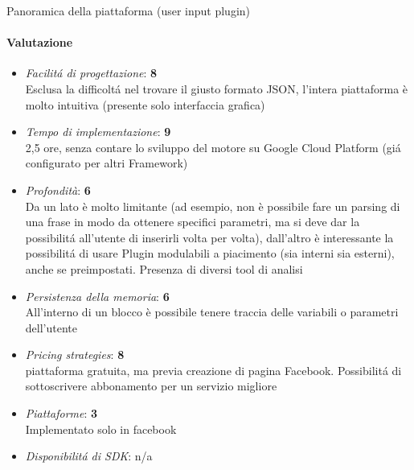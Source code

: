 \documentclass[]{article}
\begin{document}
\begin{center}
\footnotesize{Panoramica della piattaforma (user input plugin)}
\end{center}

\paragraph{Valutazione}
\begin{itemize}
\item \textit{Facilitá di progettazione}: \textbf{8} \\ Esclusa la difficoltá nel trovare il giusto formato JSON, l’intera piattaforma è molto intuitiva (presente solo interfaccia grafica)
\item \textit{Tempo di implementazione}: \textbf{9} \\ 2,5 ore, senza contare lo sviluppo del motore su Google Cloud Platform (giá configurato per altri Framework)
\item \textit{Profondità}: \textbf{6} \\ Da un lato è molto limitante (ad esempio, non è possibile fare un parsing di una frase in modo da ottenere specifici parametri, ma si deve dar la possibilitá all’utente di inserirli volta per volta), dall’altro è interessante la possibilitá di usare Plugin modulabili a piacimento (sia interni sia esterni), anche se preimpostati. Presenza di diversi tool di analisi
\item \textit{Persistenza della memoria}: \textbf{6} \\  All’interno di un blocco è possibile tenere traccia delle variabili o parametri dell’utente
\item \textit{Pricing strategies}: \textbf{8} \\  piattaforma gratuita, ma previa creazione di pagina Facebook. Possibilitá di sottoscrivere abbonamento per un servizio migliore
\item \textit{Piattaforme}: \textbf{3} \\ Implementato solo in facebook
\item \textit{Disponibilitá di SDK}: n/a
\end{itemize}
\end{document}
